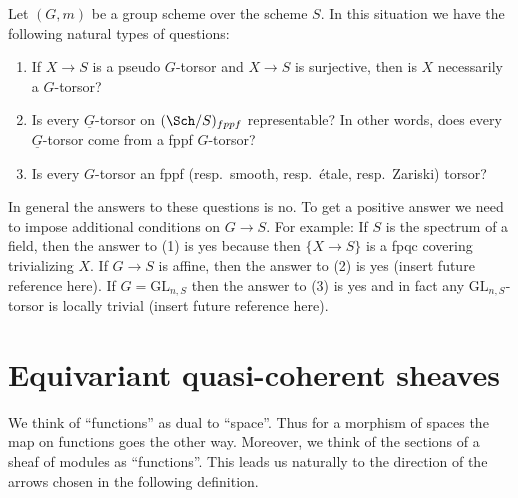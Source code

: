 \begin{remark}
\label{remark-fun-with-torsors}
Let $(G, m)$ be a group scheme over the scheme $S$.
In this situation we have the following natural types of questions:
\begin{enumerate}
\item If $X \to S$ is a pseudo $G$-torsor and $X \to S$ is surjective,
then is $X$ necessarily a $G$-torsor?
\item Is every $\underline{G}$-torsor on $(\Sch/S)_{fppf}$
representable? In other words, does every $\underline{G}$-torsor
come from a fppf $G$-torsor?
\item Is every $G$-torsor an
fppf (resp.\ smooth, resp.\ \'etale, resp.\ Zariski) torsor?
\end{enumerate}
In general the answers to these questions is no. To get a positive answer
we need to impose additional conditions on $G \to S$.
For example:
If $S$ is the spectrum of a field, then the answer to (1) is yes
because then $\{X \to S\}$ is a fpqc covering trivializing $X$.
If $G \to S$ is affine, then the answer to (2) is yes
(insert future reference here).
If $G = \text{GL}_{n, S}$ then the answer to (3) is yes
and in fact any $\text{GL}_{n, S}$-torsor is locally trivial
(insert future reference here).
\end{remark}



\section{Equivariant quasi-coherent sheaves}
\label{section-equivariant}

\noindent
We think of ``functions'' as dual to ``space''. Thus for a morphism of spaces
the map on functions goes the other way. Moreover, we think of the
sections of a sheaf of modules as ``functions''. This leads us naturally
to the direction of the arrows chosen in the following definition.

